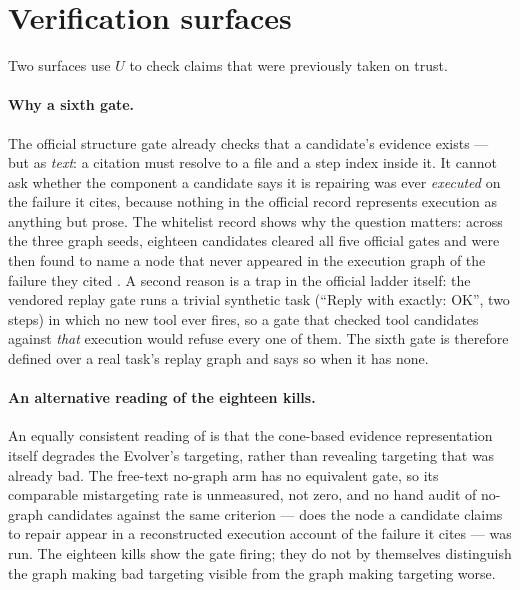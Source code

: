 \section{Verification surfaces}
\label{sec:verification}

Two surfaces use $U$ to check claims that were previously taken on trust.

\paragraph{Why a sixth gate.} The official structure gate already checks
that a candidate's evidence exists --- but as \emph{text}: a citation must
resolve to a file and a step index inside it. It cannot ask whether the
component a candidate says it is repairing was ever \emph{executed} on the
failure it cites, because nothing in the official record represents
execution as anything but prose. The whitelist record shows why the question
matters: across the three graph seeds, eighteen candidates cleared all
five official gates and were then found to name a node that never
appeared in the execution graph of the failure they cited . A
second reason is a trap in the official ladder itself: the
vendored replay gate runs a trivial synthetic task (``Reply with exactly:
OK'', two steps) in which no new tool ever fires, so a gate that checked
tool candidates against \emph{that} execution would refuse every one of
them. The sixth gate is therefore defined over a real task's replay graph
and says so when it has none.

\paragraph{An alternative reading of the eighteen kills.} An equally
consistent reading of  is that the cone-based evidence
representation itself degrades the Evolver's targeting, rather than
revealing targeting that was already bad. The free-text no-graph arm has
no equivalent gate, so its comparable mistargeting rate is unmeasured, not
zero, and no hand audit of no-graph candidates against the same criterion
--- does the node a candidate claims to repair appear in a reconstructed
execution account of the failure it cites --- was run. The eighteen kills
show the gate firing; they do not by themselves distinguish the graph
making bad targeting visible from the graph making targeting worse.

